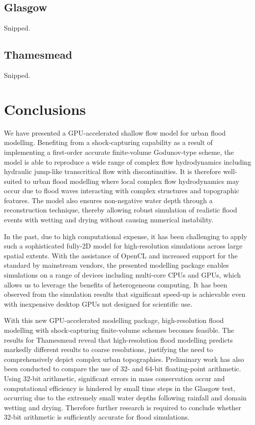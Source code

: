 \subsection{Glasgow}

Snipped.

\subsection{Thamesmead}

Snipped.

\section{Conclusions}

We have presented a GPU-accelerated shallow flow model for urban flood modelling. Benefiting from a shock-capturing capability as a result of implementing a first-order accurate finite-volume Godunov-type scheme, the model is able to reproduce a wide range of complex flow hydrodynamics including hydraulic jump-like transcritical flow with discontinuities. It is therefore well-suited to urban flood modelling where local complex flow hydrodynamics may occur due to flood waves interacting with complex structures and topographic features. The model also ensures non-negative water depth through a reconstruction technique, thereby allowing robust simulation of realistic flood events with wetting and drying without causing numerical instability. 

In the past, due to high computational expense, it has been challenging to apply such a sophisticated fully-2D model for high-resolution simulations across large spatial extents. With the assistance of OpenCL and increased support for the standard by mainstream vendors, the presented modelling package enables simulations on a range of devices including multi-core CPUs and GPUs, which allows us to leverage the benefits of heterogeneous computing. It has been observed from the simulation results that significant speed-up is achievable even with inexpensive desktop GPUs not designed for scientific use. 

With this new GPU-accelerated modelling package, high-resolution flood modelling with shock-capturing finite-volume schemes becomes feasible. The results for Thamesmead reveal that high-resolution flood modelling predicts markedly different results to coarse resolutions, justifying the need to comprehensively depict complex urban topographies. Preliminary work has also been conducted to compare the use of 32- and 64-bit floating-point arithmetic. Using 32-bit arithmetic, significant errors in mass conservation occur and computational efficiency is hindered by small time steps in the Glasgow test, occurring due to the extremely small water depths following rainfall and domain wetting and drying. Therefore further research is required to conclude whether 32-bit arithmetic is sufficiently accurate for flood simulations.
